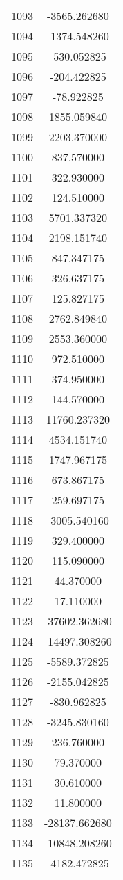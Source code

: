 \documentclass[12pt]{article}
\begin{document}
\begin{longtable}{@{}cc@{}}
1093 & -3565.262680 \\
1094 & -1374.548260 \\
1095 & -530.052825 \\
1096 & -204.422825 \\
1097 & -78.922825 \\
1098 & 1855.059840 \\
1099 & 2203.370000 \\
1100 & 837.570000 \\
1101 & 322.930000 \\
1102 & 124.510000 \\
1103 & 5701.337320 \\
1104 & 2198.151740 \\
1105 & 847.347175 \\
1106 & 326.637175 \\
1107 & 125.827175 \\
1108 & 2762.849840 \\
1109 & 2553.360000 \\
1110 & 972.510000 \\
1111 & 374.950000 \\
1112 & 144.570000 \\
1113 & 11760.237320 \\
1114 & 4534.151740 \\
1115 & 1747.967175 \\
1116 & 673.867175 \\
1117 & 259.697175 \\
1118 & -3005.540160 \\
1119 & 329.400000 \\
1120 & 115.090000 \\
1121 & 44.370000 \\
1122 & 17.110000 \\
1123 & -37602.362680 \\
1124 & -14497.308260 \\
1125 & -5589.372825 \\
1126 & -2155.042825 \\
1127 & -830.962825 \\
1128 & -3245.830160 \\
1129 & 236.760000 \\
1130 & 79.370000 \\
1131 & 30.610000 \\
1132 & 11.800000 \\
1133 & -28137.662680 \\
1134 & -10848.208260 \\
1135 & -4182.472825 \\

\end{longtable}
\end{document}
